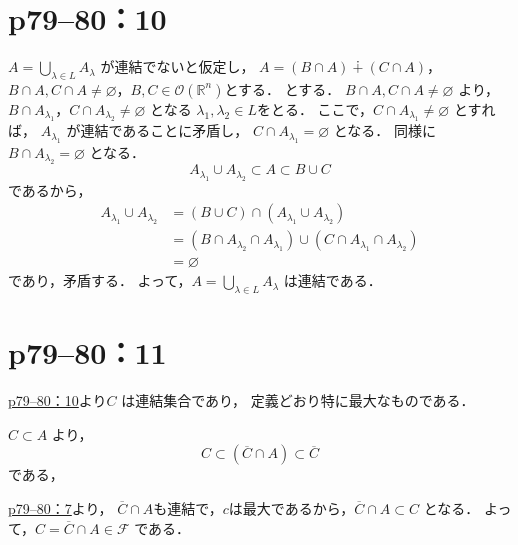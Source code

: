 \section*{p79--80：10} \label{p79--80：10}
\begin{tproof}
    $A = \bigcup_{\lambda \in L} A_\lambda$ が連結でないと仮定し，
    $A =(B \cap A)\dotplus(C \cap A)$，$B \cap A ,C \cap A \neq \varnothing$，$B, C \in \mathcal{O}(\mathbb{R}^n)$とする．
    とする．
    $ B \cap A ,C \cap A \neq \varnothing$ より，$B \cap A_{\lambda_1}$，$C \cap A_{\lambda_2} \neq \varnothing$
    となる $\lambda_1,\lambda_2 \in L$をとる．
    ここで，$C \cap A_{\lambda_1} \neq \varnothing$ とすれば，
    $A_{\lambda_1}$ が連結であることに矛盾し，
    $C \cap A_{\lambda_1} = \varnothing$ となる．
    同様に $B \cap A_{\lambda_2} = \varnothing$ となる．
    \[
        A_{\lambda_1} \cup A_{\lambda_2} \subset  A \subset B \cup C
    \]
    であるから，
    \begin{align*}
        A_{\lambda_1} \cup A_{\lambda_2} & =( B \cup C) \cap (A_{\lambda_1} \cup A_{\lambda_2})                                      \\
                                         & =(B \cap A_{\lambda_2} \cap A_{\lambda_1}) \cup (C \cap A_{\lambda_1} \cap A_{\lambda_2}) \\
                                         & =\varnothing
    \end{align*}
    であり，矛盾する．
    よって，$A = \bigcup_{\lambda \in L} A_\lambda$ は連結である．
\end{tproof}


\section*{p79--80：11} \label{p79--80：11}
\begin{tproof}
    \hyperref[p79--80：10]{p79--80：10}より$C$ は連結集合であり，
    定義どおり特に最大なものである．

    $C \subset A$ より，
    \[
        C \subset (\overline{C} \cap A) \subset \overline{C}
    \]
    である，

    \hyperref[p79--80：7]{p79--80：7}より，
    $\overline{C} \cap A$も連結で，$c$は最大であるから，$\overline{C} \cap A \subset C$ となる．
    よって，$ C = \overline{C} \cap A \in \mathcal{F}$ である．
\end{tproof}


